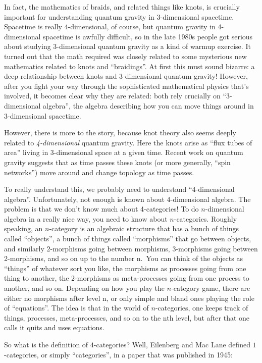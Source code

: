 \documentclass{article}
\begin{document}
In fact, the mathematics of braids, and related things like knots, is
crucially important for understanding quantum gravity in
\(3\)-dimensional spacetime. Spacetime is really \(4\)-dimensional, of
course, but quantum gravity in \(4\)-dimensional spacetime is awfully
difficult, so in the late 1980s people got serious about studying
\(3\)-dimensional quantum gravity as a kind of warmup exercise. It
turned out that the math required was closely related to some mysterious
new mathematics related to knots and ``braidings''. At first this must
sound bizarre: a deep relationship between knots and \(3\)-dimensional
quantum gravity! However, after you fight your way through the
sophisticated mathematical physics that's involved, it becomes clear why
they are related: both rely crucially on ``3-dimensional algebra'', the
algebra describing how you can move things around in \(3\)-dimensional
spacetime.

However, there is more to the story, because knot theory also seems
deeply related to \emph{4-dimensional} quantum gravity. Here the knots
arise as ``flux tubes of area'' living in \(3\)-dimensional space at a
given time. Recent work on quantum gravity suggests that as time passes
these knots (or more generally, ``spin networks'') move around and
change topology as time passes.

To really understand this, we probably need to understand
``4-dimensional algebra''. Unfortunately, not enough is known about
4-dimensional algebra. The problem is that we don't know much about
4-categories! To do \(n\)-dimensional algebra in a really nice way, you
need to know about \(n\)-categories. Roughly speaking, an \(n\)-category
is an algebraic structure that has a bunch of things called ``objects'',
a bunch of things called ``morphisms'' that go between objects, and
similarly \(2\)-morphisms going between morphisms, \(3\)-morphisms going
between 2-morphisms, and so on up to the number n.~You can think of the
objects as ``things'' of whatever sort you like, the morphisms as
processes going from one thing to another, the \(2\)-morphisms as
meta-processes going from one process to another, and so on. Depending
on how you play the \(n\)-category game, there are either no morphisms
after level n, or only simple and bland ones playing the role of
``equations''. The idea is that in the world of \(n\)-categories, one
keeps track of things, processes, meta-processes, and so on to the nth
level, but after that one calls it quits and uses equations.

So what is the definition of \(4\)-categories? Well, Eilenberg and Mac
Lane defined \(1\)-categories, or simply ``categories'', in a paper that
was published in 1945:
\end{document}
